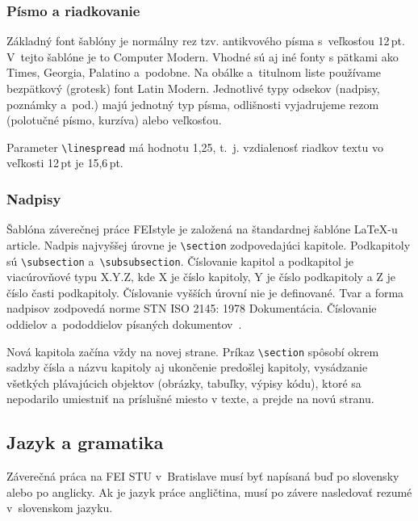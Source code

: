 \subsubsection*{Písmo a riadkovanie}
Základný font šablóny je normálny rez tzv. antikvového písma
s~veľkosťou 12\,pt.
V~tejto šablóne je to Computer Modern.
Vhodné sú aj iné fonty s pätkami ako Times, Georgia, Palatino a~podobne.
Na obálke a~titulnom liste používame bezpätkový (grotesk) font Latin Modern.
Jednotlivé typy odsekov (nadpisy, poznámky a~pod.)
majú jednotný typ písma,
odlišnosti vyjadrujeme rezom (polotučné písmo, kurzíva)
alebo veľkosťou.

Parameter \verb|\linespread| má hodnotu 1,25, t.~j.
vzdialenosť riadkov textu vo veľkosti 12\,pt je 15,6\,pt.

\subsubsection*{Nadpisy}
Šablóna záverečnej práce FEIstyle je založená na
štandardnej šablóne \LaTeX-u article.
Nadpis najvyššej úrovne je \verb|\section| zodpovedajúci kapitole.
Podkapitoly sú \verb|\subsection| a~\verb|\subsubsection|.
Číslovanie kapitol a podkapitol je viacúrovňové typu X.Y.Z, kde X je číslo kapitoly, Y je číslo podkapitoly a Z je číslo časti podkapitoly.
Číslovanie vyšších úrovní nie je definované.
Tvar a forma nadpisov zodpovedá norme STN ISO 2145: 1978 Dokumentácia.
Číslovanie oddielov a~pododdielov písaných dokumentov~\cite{iso2145}.

Nová kapitola začína vždy na novej strane.
Príkaz \verb|\section| spôsobí okrem sadzby čísla a názvu kapitoly aj ukončenie predošlej kapitoly, vysádzanie všetkých plávajúcich objektov (obrázky, tabuľky, výpisy kódu), ktoré sa nepodarilo umiestniť na príslušné miesto v texte, a prejde na novú stranu.

\subsection{Jazyk a gramatika}
Záverečná práca na FEI STU v~Bratislave musí byť napísaná
buď po slovensky alebo po anglicky.
Ak je jazyk práce angličtina, musí po závere nasledovať
rezumé v~slovenskom jazyku.

